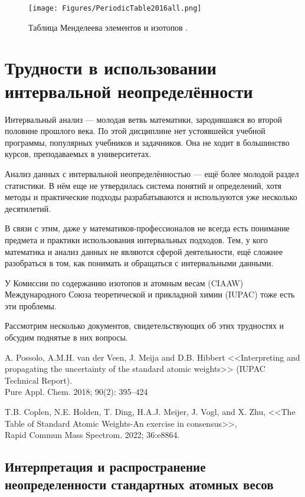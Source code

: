 \documentclass[a5paper,openany]{book}
\begin{document}
\begin{figure}[ht] 
	\centering\small
	\unitlength=1mm
	\texttt{[image: Figures/PeriodicTable2016all.png]} 
	\caption{Таблица Менделеева элементов и изотопов \cite{IUPAC}.} 
	\label{f:PeriodicTable}
\end{figure}

\chapter{Трудности в использовании интервальной неопределённости}

Интервальный анализ --- молодая ветвь математики, зародившаяся во второй половине прошлого века. По этой дисциплине нет устоявшейся учебной программы, популярных учебников и задачников. Она не ходит в большинство курсов, преподаваемых в университетах.

Анализ данных с интервальной неопределённостью --- ещё более молодой раздел статистики. В нём еще не утвердилась система понятий и определений, хотя методы и практические подходы разрабатываются и используются уже несколько десятилетий.

В связи с этим, даже у математиков-профессионалов не всегда есть понимание предмета и практики использования интервальных подходов. Тем, у кого математика и анализ данных не являются сферой деятельности, ещё сложнее разобраться в том, как понимать и обращаться с интервальными данными.  

У Комиссии по содержанию изотопов и атомным весам (CIAAW) Международного Союза теоретической и прикладной химии (IUPAC) тоже есть эти проблемы.

Рассмотрим несколько документов, свидетельствующих об этих трудностях и обсудим поднятые в них вопросы. 

A. Possolo, A.M.H. van der Veen, J. Meija and D.B. Hibbert
<<Interpreting and propagating the uncertainty of the standard atomic weights>> (IUPAC Technical Report). \\
Pure Appl. Chem. 2018; 90(2): 395–424 \cite{IUPACUncertainty}

T.B. Coplen, N.E. Holden, T. Ding, H.A.J. Meijer, J. Vogl, and X. Zhu, <<The Table of Standard Atomic Weights-An exercise in consensus>>, \\ Rapid Commun Mass Spectrom. 2022; 36:e8864. \cite{IUPACCosensus}


\section{Интерпретация и распространение неопределенности стандартных атомных весов}
\end{document}
